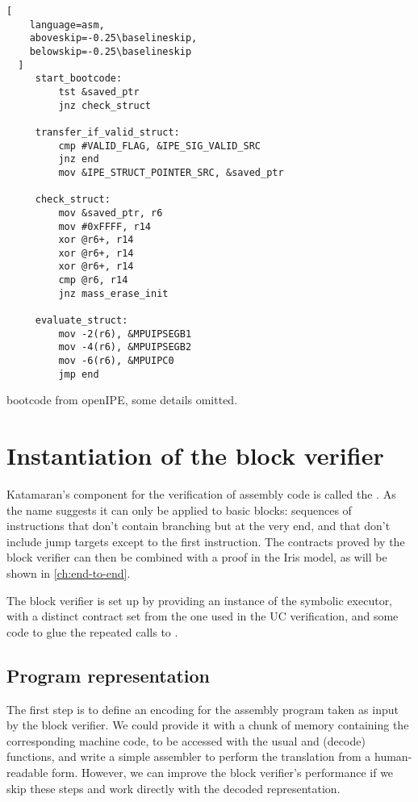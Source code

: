 \begin{listing}[t]
  \begin{lstlisting}[
    language=asm,
    aboveskip=-0.25\baselineskip,
    belowskip=-0.25\baselineskip
  ]
     start_bootcode:
         tst &saved_ptr
         jnz check_struct

     transfer_if_valid_struct:
         cmp #VALID_FLAG, &IPE_SIG_VALID_SRC
         jnz end
         mov &IPE_STRUCT_POINTER_SRC, &saved_ptr

     check_struct:
         mov &saved_ptr, r6
         mov #0xFFFF, r14
         xor @r6+, r14
         xor @r6+, r14
         xor @r6+, r14
         cmp @r6, r14
         jnz mass_erase_init

     evaluate_struct:
         mov -2(r6), &MPUIPSEGB1
         mov -4(r6), &MPUIPSEGB2
         mov -6(r6), &MPUIPC0
         jmp end
  \end{lstlisting}
  \caption{\msp bootcode from openIPE, some details omitted.}
  \label{lst:bootcode}
\end{listing}

\section{Instantiation of the block verifier}

Katamaran's component for the verification of assembly code is called the . As the name suggests it can only be applied to basic blocks: sequences of instructions that don't contain branching but at the very end, and that don't include jump targets except to the first instruction. The contracts proved by the block verifier can then be combined with a proof in the Iris model, as will be shown in \cref{ch:end-to-end}.

The block verifier is set up by providing an instance of the symbolic executor,
with a distinct contract set from the one used in the UC verification, and some code to glue the repeated calls to .

\subsection{Program representation}
\label{sec:program-representation}

The first step is to define an encoding for the assembly program taken as input by the block verifier. We could provide it with a chunk of memory containing the corresponding machine code, to be accessed with the usual  and  (decode) functions, and write a simple assembler to perform the translation from a human-readable form. However, we can improve the block verifier's performance if we skip these steps and work directly with the decoded representation.

